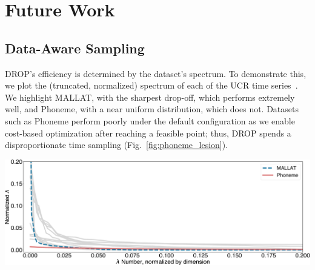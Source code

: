 \section{Future Work}
\label{subsec:disc}



\subsection{Data-Aware Sampling}

DROP's efficiency is determined by the dataset's spectrum.
To demonstrate this, we plot the (truncated, normalized) spectrum of each of the UCR time series~\cite{ucr}.
We highlight MALLAT, with the sharpest drop-off, which performs extremely well, and Phoneme, with a near uniform distribution, which does not.
Datasets such as Phoneme perform poorly under the default configuration as we enable cost-based optimization after reaching a feasible point; thus, DROP spends a disproportionate time sampling (Fig.~\ref{fig:phoneme_lesion}). 

\vspace{.2cm}
\includegraphics[width= .9\linewidth]{figs/spectrum-rev.pdf}


